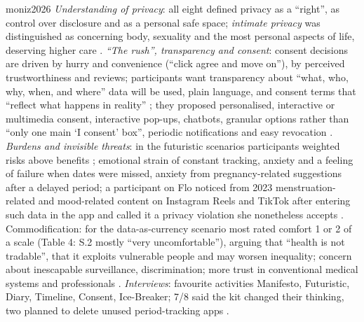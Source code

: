 \begin{papercard}{moniz2026}
 \emph{Understanding of privacy}: all eight defined privacy as a ``right'', as control over disclosure and as a personal safe space; \emph{intimate privacy} was distinguished as concerning body, sexuality and the most personal aspects of life, deserving higher care . \emph{``The rush'', transparency and consent}: consent decisions are driven by hurry and convenience (``click agree and move on''), by perceived trustworthiness and reviews; participants want transparency about ``what, who, why, when, and where'' data will be used, plain language, and consent terms that ``reflect what happens in reality'' ; they proposed personalised, interactive or multimedia consent, interactive pop-ups, chatbots, granular options rather than ``only one main `I consent' box'', periodic notifications and easy revocation . \emph{Burdens and invisible threats}: in the futuristic scenarios participants weighted risks above benefits ; emotional strain of constant tracking, anxiety and a feeling of failure when dates were missed, anxiety from pregnancy-related suggestions after a delayed period; a participant on Flo noticed from 2023 menstruation-related and mood-related content on Instagram Reels and TikTok after entering such data in the app and called it a privacy violation she nonetheless accepts . Commodification: for the data-as-currency scenario most rated comfort 1 or 2 of a scale (Table 4: S.2 mostly ``very uncomfortable''), arguing that ``health is not tradable'', that it exploits vulnerable people and may worsen inequality; concern about inescapable surveillance, discrimination; more trust in conventional medical systems and professionals . \emph{Interviews}: favourite activities Manifesto, Futuristic, Diary, Timeline, Consent, Ice-Breaker; 7/8 said the kit changed their thinking, two planned to delete unused period-tracking apps .


\end{papercard}
